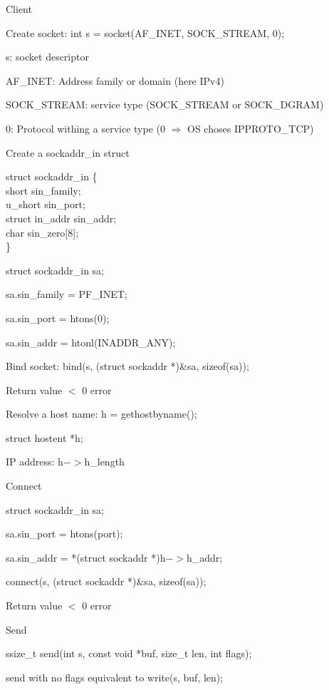 	\item Client
	\enumstart
		\item Create socket: int s = socket(AF\_INET, SOCK\_STREAM, 0);
		\enumstart
			\item s: socket descriptor
			\item AF\_INET: Address family or domain (here IPv4)
			\item SOCK\_STREAM: service type (SOCK\_STREAM or SOCK\_DGRAM)
			\item 0: Protocol withing a service type (0 $\Rightarrow$ OS choses IPPROTO\_TCP)
		\enumend
		\item Create a sockaddr\_in struct
		\enumstart
			\item struct sockaddr\_in \{\\short sin\_family;\\u\_short sin\_port;\\struct in\_addr sin\_addr;\\char sin\_zero[8];\\ \}
			\item struct sockaddr\_in sa;
			\item sa.sin\_family = PF\_INET;
			\item sa.sin\_port = htons(0);
			\item sa.sin\_addr = htonl(INADDR\_ANY);
		\enumend
		\item Bind socket: bind(s, (struct sockaddr *)\&sa, sizeof(sa));
		\enumstart
			\item Return value $<$ 0 \arrow error
		\enumend
		\item Resolve a host name: h = gethostbyname();
		\enumstart
			\item struct hostent *h;
			\item IP address: h$->$h\_length
		\enumend
		\item Connect
		\enumstart
			\item struct sockaddr\_in sa;
			\item sa.sin\_port = htons(port);
			\item sa.sin\_addr = *(struct sockaddr *)h$->$h\_addr;
			\item connect(s, (struct sockaddr *)\&sa, sizeof(sa));
			\enumstart
				\item Return value $<$ 0 \arrow error
			\enumend
		\enumend
		\item Send
		\enumstart
			\item ssize\_t send(int s, const void *buf, size\_t len, int flags);
			\item send with no flags equivalent to write(s, buf, len);
